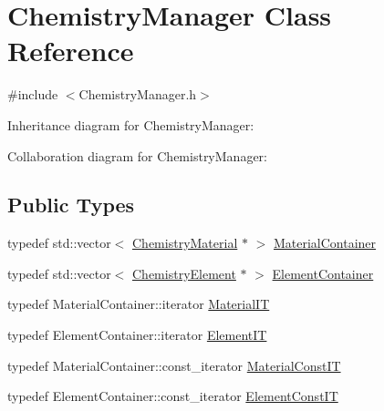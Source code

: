 \hypertarget{classChemistryManager}{}\section{Chemistry\+Manager Class Reference}
\label{classChemistryManager}


{\ttfamily \#include $<$Chemistry\+Manager.\+h$>$}



Inheritance diagram for Chemistry\+Manager\+:


Collaboration diagram for Chemistry\+Manager\+:
\subsection*{Public Types}
\begin{DoxyCompactItemize}
\item 
typedef std\+::vector$<$ \hyperlink{classChemistryMaterial}{Chemistry\+Material} $\ast$ $>$ \hyperlink{classChemistryManager_aed6b958024dc4300fd9dfbbbcf819ac1}{Material\+Container}
\item 
typedef std\+::vector$<$ \hyperlink{classChemistryElement}{Chemistry\+Element} $\ast$ $>$ \hyperlink{classChemistryManager_a497405ec5c9312ef9a37298ff3b2506c}{Element\+Container}
\item 
typedef Material\+Container\+::iterator \hyperlink{classChemistryManager_a4fc68d271af8c4b424e06d350ecc4fb8}{Material\+IT}
\item 
typedef Element\+Container\+::iterator \hyperlink{classChemistryManager_adc7451eba7244ac677ffc00f9b6bd6b0}{Element\+IT}
\item 
typedef Material\+Container\+::const\+\_\+iterator \hyperlink{classChemistryManager_a106969fc62cbfc5b24f4e95e7fdfaef7}{Material\+Const\+IT}
\item 
typedef Element\+Container\+::const\+\_\+iterator \hyperlink{classChemistryManager_a9ce1f32f52966ba360c8c9d443147908}{Element\+Const\+IT}
\end{DoxyCompactItemize}
